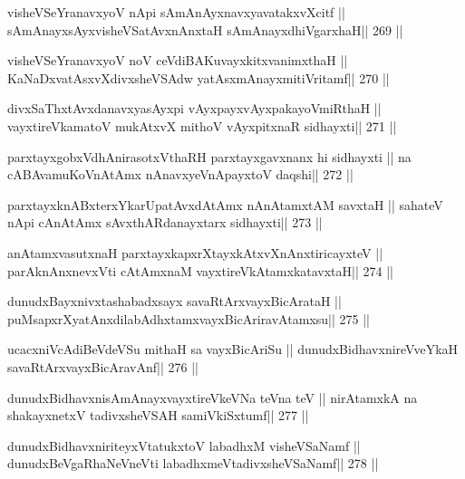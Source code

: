 \begin{shl}
visheVSeYranavxyoV nApi sAmAnAyxnavxyavatakxvXcitf ||
sAmAnayxsAyxvisheVSatAvxnAnxtaH sAmAnayxdhiVgarxhaH\hfill || 269 ||
\end{shl}

\begin{shl}
visheVSeYranavxyoV noV ceVdiBAKuvayxkitxvanimxthaH ||
KaNaDxvatAsxvXdivxsheVSAdw yatAsxmAnayxmitiVritamf\hfill || 270 ||
\end{shl}

\begin{shl}
divxSaThxtAvxdanavxyasAyxpi vAyxpayxvAyxpakayoVmiRthaH ||
vayxtireVkamatoV mukAtxvX mithoV vAyxpitxnaR sidhayxti\hfill || 271 ||
\end{shl}

\begin{shl}
parxtayxgobxVdhAnirasotxV\s thaRH parxtayxgavxnanx hi sidhayxti ||
na cABAvamuKoV\s nAtAmx nAnavxyeVnApayxtoV daqshi\hfill || 272 ||
\end{shl}

\begin{shl}
parxtayxknABxterxYkarUpatAvxdAtAmx nAnAtamxtAM savxtaH ||
sahateV nApi cAnAtAmx sAvxthARdanayxtarx sidhayxti\hfill || 273 ||
\end{shl}

\begin{shl}
anAtamxvasutxnaH parxtayxkapxrXtayxkAtxvXnAnxtiricayxteV ||
parAknAnxnevxVti cA\s\s tAmxnaM vayxtireVkAtamxkatavxtaH\hfill || 274 ||
\end{shl}

\begin{shl}
dunudxBayxnivxtashabadxsayx savaRtArxvayxBicArataH ||
puMsapxrXyatAnxdilabAdhxtamxvayxBicAriravAtamxsu\hfill || 275 ||
\end{shl}

\begin{shl}
ucacxniVcAdiBeVdeVSu mithaH sa vayxBicAriSu ||
dunudxBidhavxnireVveYkaH savaRtArxvayxBicAravAnf\hfill || 276 ||
\end{shl}

\begin{shl}
dunudxBidhavxnisAmAnayxvayxtireVkeVNa teVna teV ||
nirAtamxkA na shakayxnetxV tadivxsheVSAH samiVkiSxtumf\hfill || 277 ||
\end{shl}

\begin{shl}
dunudxBidhavxniriteyxVtatukxtoV labadhxM visheVSaNamf ||
dunudxBeVgaRhaNeVneVti labadhxmeVtadivxsheVSaNamf\hfill || 278 ||
\end{shl}

